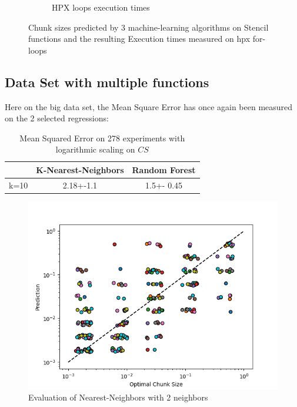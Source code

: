 \begin{figure}[h]
\begin{subfigure}[b]{0.49\textwidth}
		\caption[]%
		{{HPX loops execution times}}    
	\end{subfigure}
	\caption{Chunk sizes predicted by 3 machine-learning algorithms on Stencil functions and the resulting Execution times measured on hpx for-loops} 
\end{figure}
\subsection{Data Set with multiple functions}

Here on the big data set, the Mean Square Error has once again been measured on the 2 selected regressions:

\begin{table}[h]
	\centering
	\caption{Mean Squared Error on 278 experiments with logarithmic scaling on $CS$ }
	\label{my-label}
	\begin{tabular}{|c|c|c|}
		\hline
		& K-Nearest-Neighbors & Random Forest \\ \hline
		k=10  & 2.18+-1.1        & 1.5+- 0.45 \\ \hline
	\end{tabular}
\end{table}
\begin{figure}[H]
	\centering
	\includegraphics[width=120mm]{images/KNNR_eval_big.png}
	\caption{Evaluation of Nearest-Neighbors with 2 neighbors}
\end{figure}

